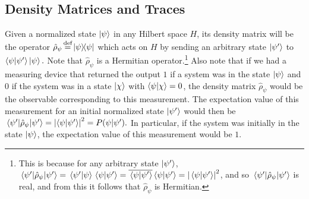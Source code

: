     \subsection{Density Matrices and Traces}
    Given a normalized state $\ket{\psi}$ in any Hilbert space $H$,  its density matrix will be the operator $\hat{\rho}_\psi\myeq\dyad{\psi}$ which acts on $H$ by sending an arbitrary state $\ket{\psi'}$ to $\ip{\psi}{\psi'}\ket{\psi}.$  Note that $\hat{\rho}_\psi$ is a Hermitian operator.\footnote{This is because for any arbitrary state $\ket{\psi'}$, $\ev*{\hat{\rho}_\psi}{{\psi'}} = \ip*{\psi'}{\psi} \ip*{\psi}{\psi'}=\overline{\ip*{\psi}{\psi'}}\ip*{\psi}{\psi'}=\abs{\ip*{\psi}{\psi'}}^2$, and so $\ev*{\hat{\rho}_\psi}{{\psi'}}$ is real, and from this it follows that $\hat{\rho}_\psi$ is Hermitian. } Also note that if we had a measuring device that returned the output $1$ if a system was in the state $\ket{\psi}$ and $0$ if the system was in a state $\ket{\chi}$ with $\ip{\psi}{\chi}=0$, the density matrix $\hat{\rho}_\psi$ would be the observable corresponding to this measurement. The expectation value of this measurement for an initial normalized state $\ket{\psi'}$ would then be $\ev*{\hat{\rho}_\psi}{\psi'}=\abs{\ip{\psi}{\psi'}}^2=P(\psi|\psi').$ In particular, if the system was initially in the state $\ket{\psi}$, the expectation value of this measurement would be $1$.
    

